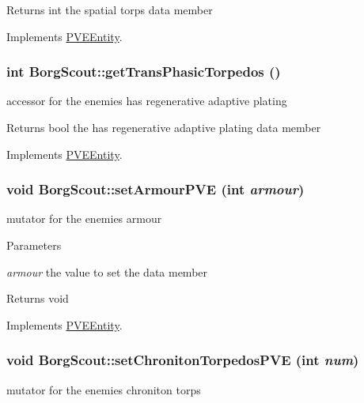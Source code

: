 \begin{DoxyReturn}{Returns}
int the spatial torps data member 
\end{DoxyReturn}


Implements \hyperlink{classPVEEntity}{PVEEntity}.

\hypertarget{classBorgScout_a88484687d5bbe7616fd2b8f6a705eb34}{
\subsubsection[{getTransPhasicTorpedos}]{\setlength{\rightskip}{0pt plus 5cm}int BorgScout::getTransPhasicTorpedos ()}}
\label{d5/d8c/classBorgScout_a88484687d5bbe7616fd2b8f6a705eb34}
accessor for the enemies has regenerative adaptive plating

\begin{DoxyReturn}{Returns}
bool the has regenerative adaptive plating data member 
\end{DoxyReturn}


Implements \hyperlink{classPVEEntity}{PVEEntity}.

\hypertarget{classBorgScout_ab4cfe88166b8473ec3901afc1f05b462}{
\subsubsection[{setArmourPVE}]{\setlength{\rightskip}{0pt plus 5cm}void BorgScout::setArmourPVE (int {\em armour})}}
\label{d5/d8c/classBorgScout_ab4cfe88166b8473ec3901afc1f05b462}
mutator for the enemies armour


\begin{DoxyParams}{Parameters}
\item[{\em armour}]the value to set the data member\end{DoxyParams}
\begin{DoxyReturn}{Returns}
void 
\end{DoxyReturn}


Implements \hyperlink{classPVEEntity}{PVEEntity}.

\hypertarget{classBorgScout_a82eb31f8b1d94b9ea57cadb97bd276f3}{
\subsubsection[{setChronitonTorpedosPVE}]{\setlength{\rightskip}{0pt plus 5cm}void BorgScout::setChronitonTorpedosPVE (int {\em num})}}
\label{d5/d8c/classBorgScout_a82eb31f8b1d94b9ea57cadb97bd276f3}
mutator for the enemies chroniton torps


